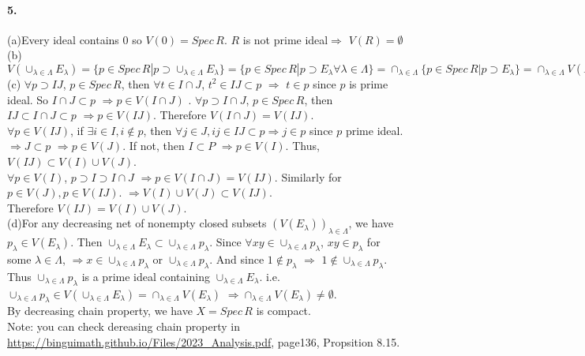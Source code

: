 \documentclass{article}
\begin{document}
\paragraph{5.}
(a)Every ideal contains 0 so  $ V(0)=Spec \, R $. $ R  $ is not prime ideal$ \Rightarrow $  $ V(R)=\emptyset $  \\
(b) $ V(\cup_{\lambda\in \Lambda}E_\lambda)=\{p\in Spec\, R|p\supset \cup_{\lambda\in \Lambda}E_\lambda\}=\{p\in Spec\, R|p\supset E_\lambda\forall \lambda\in \Lambda\}=\cap_{\lambda\in \Lambda}\{p\in Spec\,R|p\supset E_\lambda\}=\cap_{\lambda\in \Lambda}V(E_\lambda) $\\
(c) $ \forall p\supset IJ $,  $ p\in Spec\, R $, then  $\forall t\in I\cap J $,  $ t^2\in IJ\subset p  $ $\Rightarrow $  $ t\in p  $ since  $ p  $ is prime ideal. So  $ I\cap J\subset p $ $ \Rightarrow p\in V(I\cap J) $ .  $ \forall p\supset I\cap J $,  $ p\in Spec\, R $, then  $ IJ\subset I\cap J\subset p $ $ \Rightarrow p\in V(IJ) $. Therefore  $ V(I\cap J)=V(IJ) $.\\
 $ \forall p\in  V(IJ)  $, if  $ \exists i\in I,i\not\in p $, then  $ \forall j\in J,ij\in IJ\subset p \Rightarrow j\in p $ since  $ p  $ prime ideal.  $ \Rightarrow J\subset p $ $ \Rightarrow p\in V(J) $. If not, then  $ I\subset P $ $ \Rightarrow p\in V(I) $. Thus,  $ V(IJ)\subset V(I)\cup V(J) $. \\
  $ \forall p\in V(I) $,  $ p\supset I\supset I\cap J $ $ \Rightarrow p\in V(I\cap J)=V(IJ) $. Similarly for  $ p\in V(J), p\in V(IJ) $.  $ \Rightarrow V(I)\cup V(J)\subset V(IJ) $. \\
  Therefore  $ V(IJ)=V(I)\cup V(J) $.\\     
(d)For any decreasing net of nonempty closed subsets  $ (V(E_\lambda))_{\lambda\in \Lambda} $, we have   $ p_\lambda\in V(E_\lambda) $. Then  $ \cup_{\lambda\in \Lambda}E_\lambda\subset\cup_{\lambda\in \Lambda}p_\lambda $. Since  $ \forall xy\in \cup_{\lambda\in \Lambda}p_\lambda $,  $ xy\in p_\lambda $ for some  $ \lambda\in \Lambda $,   $ \Rightarrow x\in \cup_{\lambda\in \Lambda}p_\lambda  $ or  $ \cup_{\lambda\in \Lambda}p_\lambda $. And since  $ 1\not\in p_\lambda $  $ \Rightarrow  $  $ 1\not\in \cup_{\lambda\in \Lambda}p_\lambda $. Thus  $ \cup_{\lambda\in \Lambda}p_\lambda  $ is a prime ideal containing $ \cup_{\lambda\in \Lambda}E_\lambda $. i.e.  $ \cup_{\lambda\in \Lambda}p_\lambda \in V(\cup_{\lambda\in \Lambda}E_\lambda)=\cap_{\lambda\in \Lambda}V(E_\lambda)$  $ \Rightarrow \cap_{\lambda\in \Lambda}V(E_\lambda)\not=\emptyset $.\\
  By decreasing chain property, we have  $ X=Spec\,R  $ is compact.\\
  Note: you can check dereasing chain property in \url{https://binguimath.github.io/Files/2023_Analysis.pdf}, page136, Propsition 8.15.      
\end{document}
